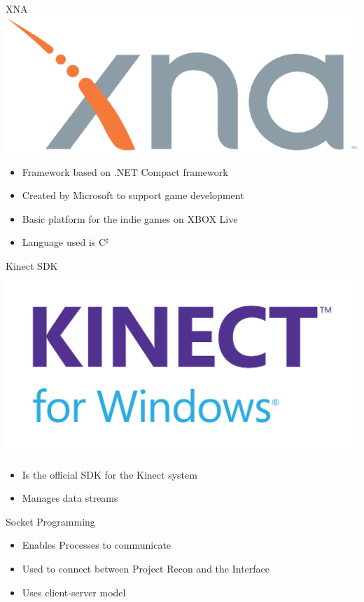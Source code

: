 \documentclass{beamer}
\begin{document}
\begin{frame}{XNA}
 \includegraphics[scale = 0.1]{XNA.png}
 \begin{itemize}
  \item Framework based on .NET Compact framework
  \item Created by Microsoft to support game development
  \item Basic platform for the indie games on XBOX Live
  \item Language used is C$^\sharp$
 \end{itemize}
\end{frame}

\begin{frame}{Kinect SDK}
\includegraphics[scale=0.075]{kinectsdk.jpg}
 \begin{itemize}
  \item Is the official SDK for the Kinect system
  \item Manages data streams
 \end{itemize}
\end{frame}

\begin{frame}{Socket Programming}
 \begin{itemize}
  \item Enables Processes to communicate
  \item Used to connect between Project Recon and the Interface
  \item Uses client-server model
 \end{itemize}
\end{frame}
\end{document}
